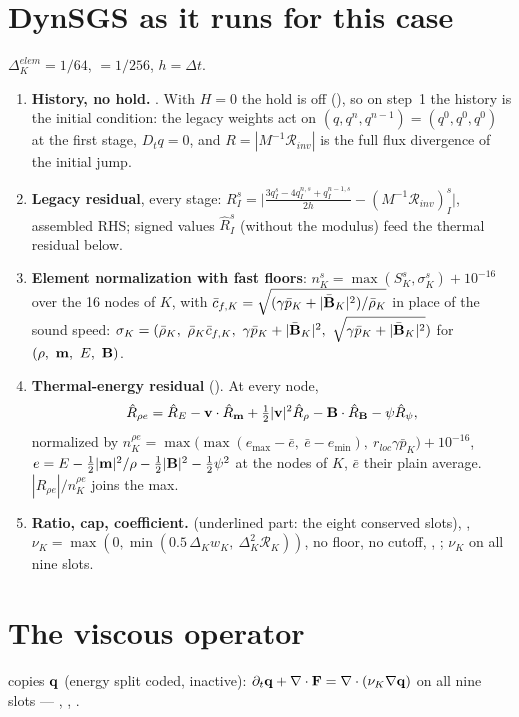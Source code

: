 \documentclass[10pt]{article}
\begin{document}
\section{DynSGS as it runs for this case}
$\Delta^{elem}_K=1/64$,  $=1/256$, $h=\Delta t$.
\begin{enumerate}[leftmargin=*]
\item \textbf{History, no hold.} . With $H=0$ the hold is off (),
so on step~1 the history is the initial condition: the legacy weights act on $(q,q^n,q^{n-1})=(q^0,q^0,q^0)$
at the first stage, $D_tq=0$, and $R=|M^{-1}\mathcal R_{inv}|$ is the full flux divergence of the initial jump.
\item \textbf{Legacy residual}, every stage: $R^s_I=\big|\tfrac{3q^s_I-4q^{n,s}_I+q^{n-1,s}_I}{2h}-(M^{-1}\mathcal R_{inv})^s_I\big|$,
assembled RHS; signed values $\hat R^s_I$ (without the modulus) feed the thermal residual below.
\item \textbf{Element normalization with fast floors}: $n^s_K=\max(S^s_K,\sigma^s_K)+10^{-16}$ over the 16 nodes of
$K$, with $\bar c_{f,K}=\sqrt{(\gamma\bar p_K+|\bar{\mathbf{B}}_K|^2)/\bar\rho_K}$ in place of the sound speed:
$\sigma_K=(\bar\rho_K,\ \bar\rho_K\bar c_{f,K},\ \gamma\bar p_K+|\bar{\mathbf{B}}_K|^2,\ \sqrt{\gamma\bar p_K+|\bar{\mathbf{B}}_K|^2})$
for $(\rho,\ \bmom,\ E,\ \bB)$.
\item \textbf{Thermal-energy residual} (). At every node,
\[
\hat R_{\rho e}=\hat R_E-\mathbf{v}\cdot\hat R_{\mathbf{m}}+\tfrac12|\mathbf{v}|^2\hat R_\rho-\mathbf{B}\cdot\hat R_{\mathbf{B}}-\psi\hat R_\psi,
\]
normalized by $n^{\rho e}_K=\max\big(\max(e_{\max}-\bar e,\ \bar e-e_{\min}),\ r_{loc}\gamma\bar p_K\big)+10^{-16}$,
$e=E-\tfrac12|\mathbf{m}|^2/\rho-\tfrac12|\mathbf{B}|^2-\tfrac12\psi^2$ at the nodes of $K$, $\bar e$ their plain average.
$|\hat R_{\rho e}|/n^{\rho e}_K$ joins the max.
\item \textbf{Ratio, cap, coefficient.}
(underlined part: the eight conserved slots),
,
$\nu_K=\max(0,\min(0.5\,\Delta_Kw_K,\ \Delta_K^2\mathcal R_K))$, no floor, no cutoff,
, ; $\nu_K$ on all nine slots.
\end{enumerate}

\section{The viscous operator}
 copies $\mathbf{q}$ (energy split coded, inactive):
$\partial_t\mathbf{q}+\nabla\cdot\mathbf{F}=\nabla\cdot(\nu_K\nabla\mathbf{q})$ on all nine slots --- , , .
\end{document}

